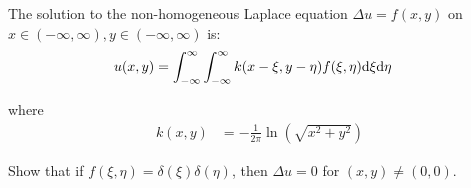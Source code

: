 \item The solution to the non-homogeneous Laplace equation $\Delta u = f(x, y)$ on $x \in (-\infty, \infty), y \in (-\infty, \infty)$ is:
%
\begin{align}
  u(x, y) & = \int^\infty_{-\infty} \int^\infty_{-\infty} k(x - \xi, y - \eta) f(\xi, \eta) \text d \xi \text d \eta
\end{align}

where
%
\begin{align}
  k(x, y) & = - \frac{1}{2 \pi} \ln\left( \sqrt{x^2 + y^2} \right)
\end{align}

Show that if $f(\xi, \eta) = \delta(\xi)\delta(\eta)$, then $\Delta u = 0$ for $(x, y) \neq (0, 0)$.
